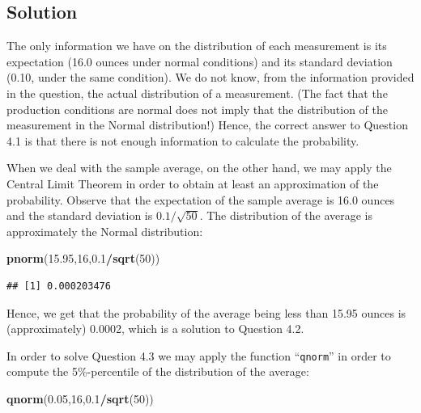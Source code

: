 \documentclass[
]{krantz}
\makeatletter
\newenvironment{Shaded}{\begin{snugshade}}{\end{snugshade}}
\newcommand{\DecValTok}[1]{\textcolor[rgb]{0.00,0.00,0.81}{#1}}
\newcommand{\FloatTok}[1]{\textcolor[rgb]{0.00,0.00,0.81}{#1}}
\newcommand{\KeywordTok}[1]{\textcolor[rgb]{0.13,0.29,0.53}{\textbf{#1}}}
\newcommand{\NormalTok}[1]{#1}
\newcommand{\OperatorTok}[1]{\textcolor[rgb]{0.81,0.36,0.00}{\textbf{#1}}}
\newenvironment{kframe}{%
\medskip{}
\setlength{\fboxsep}{.8em}
 \def\at@end@of@kframe{}%
 \ifinner\ifhmode%
  \def\at@end@of@kframe{\end{minipage}}%
  \begin{minipage}{\columnwidth}%
 \fi\fi%
 \def\FrameCommand##1{\hskip\@totalleftmargin \hskip-\fboxsep
 \colorbox{shadecolor}{##1}\hskip-\fboxsep
     \hskip-\linewidth \hskip-\@totalleftmargin \hskip\columnwidth}%
 \MakeFramed {\advance\hsize-\width
   \@totalleftmargin\z@ \linewidth\hsize
   \@setminipage}}%
 {\par\unskip\endMakeFramed%
 \at@end@of@kframe}
\renewenvironment{Shaded}{\begin{kframe}}{\end{kframe}}
\theoremstyle{definition}
\theoremstyle{definition}
\theoremstyle{definition}
\theoremstyle{remark}
\makeatother
\begin{document}
\hypertarget{solution-3}{%
\subsection*{Solution}\label{solution-3}}


The only information we have on the distribution of each measurement is
its expectation (16.0 ounces under normal conditions) and its standard
deviation (0.10, under the same condition). We do not know, from the
information provided in the question, the actual distribution of a
measurement. (The fact that the production conditions are normal does
not imply that the distribution of the measurement in the Normal
distribution!) Hence, the correct answer to Question 4.1 is that there
is not enough information to calculate the probability.

When we deal with the sample average, on the other hand, we may apply
the Central Limit Theorem in order to obtain at least an approximation
of the probability. Observe that the expectation of the sample average
is 16.0 ounces and the standard deviation is \(0.1/\sqrt{50}\). The
distribution of the average is approximately the Normal distribution:

\begin{Shaded}
\begin{Highlighting}[]
\KeywordTok{pnorm}\NormalTok{(}\FloatTok{15.95}\NormalTok{,}\DecValTok{16}\NormalTok{,}\FloatTok{0.1}\OperatorTok{/}\KeywordTok{sqrt}\NormalTok{(}\DecValTok{50}\NormalTok{))}
\end{Highlighting}
\end{Shaded}

\begin{verbatim}
## [1] 0.000203476
\end{verbatim}

Hence, we get that the probability of the average being less than 15.95
ounces is (approximately) 0.0002, which is a solution to Question 4.2.

In order to solve Question 4.3 we may apply the function ``\texttt{qnorm}'' in
order to compute the 5\%-percentile of the distribution of the average:

\begin{Shaded}
\begin{Highlighting}[]
\KeywordTok{qnorm}\NormalTok{(}\FloatTok{0.05}\NormalTok{,}\DecValTok{16}\NormalTok{,}\FloatTok{0.1}\OperatorTok{/}\KeywordTok{sqrt}\NormalTok{(}\DecValTok{50}\NormalTok{))}
\end{Highlighting}
\end{Shaded}
\end{document}

